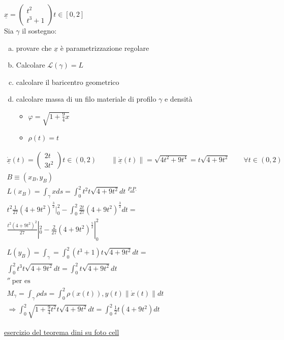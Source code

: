 \documentclass[a4paper, oneside]{article}
\begin{document}
\begin{example}
    $\underline{x} = \begin{pmatrix}
        t^2\\
        t^3+1
    \end{pmatrix} t \in[0,2]$\\
    Sia $\gamma$ il sostegno:
    \begin{enumerate}[a)]
        \item provare che $\underline{x}$ è parametrizzazione regolare
        \item Calcolare $\mathcal{L}(\gamma) = L$
        \item calcolare il baricentro geometrico
        \item calcolare massa di un filo materiale di profilo $\gamma$ e densità
        \begin{itemize}
            \item $\varphi = \sqrt{1 + \frac{9}{4}x}$
            \item $\rho(t) = t$
        \end{itemize}
    \end{enumerate}
    \begin{gather*}
        \underline{\dot{x}}(t) = \begin{pmatrix}
            2t\\
            3t^2
        \end{pmatrix}t \in (0,2) \qquad \left\lVert \underline{\dot{x}}(t) \right\rVert = \sqrt{4t^2 + 9t^4} = t\sqrt{4+9t^2} \qquad \forall t \in (0,2)\\
        B \equiv (x_B,y_B)\\
        L(x_B) = \int_{\gamma} x ds = \int_{0}^{2} t^2 t \sqrt{4+9t^2} dt \overset{P.P.}{=}\\
        t^2 \frac{1}{27}(4+9t^2)^\frac{3}{2} |_0^2 - \int_{0}^{2} \frac{2t}{27}(4+9t^2)^\frac{3}{2} dt = \\
        \frac{t^2(4+9t^2)^2}{27}|_0^2 -\frac{2}{27} (4+9t^2)^\frac{5}{2} |_0^2\\\\
        L(y_B) = \int_{\gamma} = \int_{0}^{2} (t^3+1)t \sqrt{4+9t^2} dt = \\
        \int_{0}^{2} t^3t\sqrt{4+9t^2} dt = \int_{0}^{2} t \sqrt{4+9t^2} dt\\
        '' \ \text{per es}\\
        M_\gamma = \int_{\gamma} \rho ds = \int_{0}^{2} \rho(x(t)) , y(t) \left\lVert \dot{x}(t) \right\rVert dt\\
        \Rightarrow \int_{0}^{2} \sqrt{1 + \frac{9}{4}t^2} t \sqrt{4+9t^2} dt = \int_{0}^{2} \frac{1}{2} t(4+9t^2) dt  
    \end{gather*}
\end{example}
\underline{esercizio del teorema dini su foto cell}\\
\end{document}

